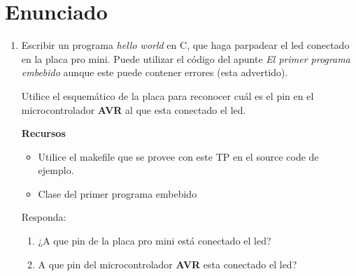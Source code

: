 \chapter*{Enunciado}

\begin{enumerate}
      \item
            Escribir un programa \textit{hello world} en C, que haga parpadear el led conectado en la placa pro mini. Puede utilizar el código del apunte \textit{El primer programa embebido} aunque este puede contener errores (esta advertido).

            Utilice el esquemático de la placa para reconocer cuál es el pin en el microcontrolador \textbf{AVR} al que esta conectado el led.

            \textbf{Recursos}
            \begin{itemize}
                  \item Utilice el makefile que se provee con este TP en el source code de ejemplo.
                  \item Clase del primer programa embebido
            \end{itemize}

            Responda:

            \begin{enumerate}[label=\arabic*]
                  \item ¿A que pin de la placa pro mini está conectado el led?
                  \item A que pin del microcontrolador \textbf{AVR} esta conectado el led?
            \end{enumerate}
\end{enumerate}
